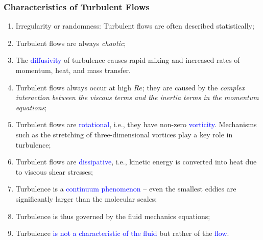 \documentclass[10pt,compress,handout,ignorenonframetext]{beamer}
\newcommand{\blue}{\textcolor{blue}}
\begin{document}
\begin{frame}
 \frametitle{Characteristics of Turbulent Flows}
   \begin{enumerate}
      \item<1-> Irregularity or randomness: Turbulent flows are often described statistically;
      \item<1-> Turbulent flows are always {\it chaotic};
      \item<1-> The \blue{diffusivity} of turbulence causes rapid mixing and increased rates of momentum, heat, and mass transfer. %
      \item<1-> Turbulent flows always occur at high $Re$; they are caused by the {\it complex interaction between the viscous terms and the inertia terms in the momentum equations};
      \item<1-> Turbulent flows are \blue{rotational}, i.e., they have non-zero \blue{vorticity}. Mechanisms such as the stretching of three-dimensional vortices play a key role in turbulence;
      \item<2-> Turbulent flows are \blue{dissipative}, i.e., kinetic energy is converted into heat due to viscous shear stresses; %
      \item<2-> Turbulence is a \blue{continuum phenomenon} -- even the smallest eddies are significantly larger than the molecular scales; 
      \item<2-> Turbulence is thus governed by the fluid mechanics equations;
      \item<2-> Turbulence \blue{is not a characteristic of the fluid} but rather of the \blue{flow}.
   \end{enumerate}
\end{frame}
\end{document}
